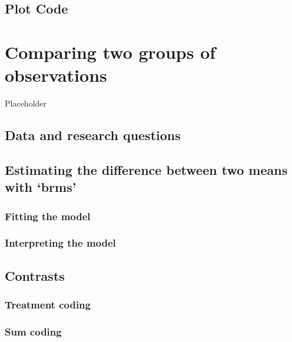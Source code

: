\documentclass[
]{book}
\begin{document}
\hypertarget{plot-code-1}{%
\section{Plot Code}\label{plot-code-1}}

\hypertarget{comparing-two-groups-of-observations}{%
\chapter{Comparing two groups of observations}\label{comparing-two-groups-of-observations}}

Placeholder

\hypertarget{data-and-research-questions-2}{%
\section{Data and research questions}\label{data-and-research-questions-2}}

\hypertarget{estimating-the-difference-between-two-means-with-brms}{%
\section{Estimating the difference between two means with `brms'}\label{estimating-the-difference-between-two-means-with-brms}}

\hypertarget{fitting-the-model-1}{%
\subsection{Fitting the model}\label{fitting-the-model-1}}

\hypertarget{interpreting-the-model}{%
\subsection{Interpreting the model}\label{interpreting-the-model}}

\hypertarget{contrasts}{%
\section{Contrasts}\label{contrasts}}

\hypertarget{treatment-coding}{%
\subsection{Treatment coding}\label{treatment-coding}}

\hypertarget{sum-coding}{%
\subsection{Sum coding}\label{sum-coding}}
\end{document}
